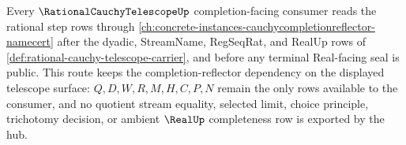 Every $\RationalCauchyTelescopeUp$ completion-facing consumer reads the rational step rows through \autoref{ch:concrete-instances-cauchycompletionreflector-namecert} after the dyadic, StreamName, RegSeqRat, and RealUp rows of \autoref{def:rational-cauchy-telescope-carrier}, and before any terminal Real-facing seal is public. This route keeps the completion-reflector dependency on the displayed telescope surface: $Q,D,W,R,M,H,C,P,N$ remain the only rows available to the consumer, and no quotient stream equality, selected limit, choice principle, trichotomy decision, or ambient $\RealUp$ completeness row is exported by the hub.
